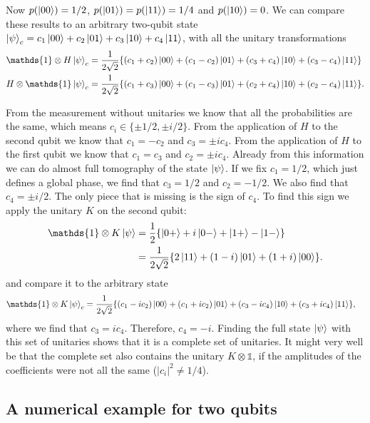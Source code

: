 \documentclass[submission, Phys]{SciPost}
\begin{document}
Now $p(\ket{00}) = 1/2$, $p(\ket{01}) = p(\ket{11}) = 1/4$ and $p(\ket{10}) = 0$.
We can compare these results to an arbitrary two-qubit state $\ket{\psi}_c = c_1 \ket{00} +c_2 \ket{01} + c_3 \ket{10} +c_4 \ket{11}$,
with all the unitary transformations
\begin{align}
	\mathds{1} \otimes H \ket{\psi}_c & = \frac{1}{2\sqrt{2}} \{ (c_1+c_2) \ket{00} + (c_1 -c_2)\ket{01} + (c_3 + c_4)\ket{10} + (c_3-c_4)\ket{11} \}  \\
	H \otimes \mathds{1} \ket{\psi}_c & = \frac{1}{2\sqrt{2}} \{ (c_1+c_3) \ket{00} + (c_1 -c_3)\ket{01} + (c_2 + c_4)\ket{10} + (c_2-c_4)\ket{11} \}.
\end{align}

From the measurement without unitaries we know that all the probabilities are the same,
which means $c_i \in \{ \pm 1/2, \pm i/2 \}$.
From the application of $H$ to the second qubit we know that $c_1 = -c_2$ and $c_3 = \pm i c_4$.
From the application of $H$ to the first qubit we know that $c_1 = c_3$ and $c_2 = \pm i c_4$.
Already from this information we can do almost full tomography of the state $\ket{\psi}$.
If we fix $c_1 = 1/2$, which just defines a global phase, we find that $c_3 = 1/2$ and $c_2 = -1/2$.
We also find that $c_4 = \pm i/2$.
The only piece that is missing is the sign of $c_4$. To find this sign we apply the unitary $K$ on the second qubit:
\begin{align}
	\mathds{1} \otimes K \ket{\psi} & = \frac{1}{2} \{ \ket{0+} +i \ket{0-} + \ket{1+} - \ket{1-} \}           \\
	                                & = \frac{1}{2 \sqrt{2}} \{ 2 \ket{11} + (1-i)\ket{01} + (1+i)\ket{00} \}.
\end{align}
%
and compare it to the arbitrary state
%
\begin{align}
	\mathds{1} \otimes K \ket{\psi}_c & = \frac{1}{2\sqrt{2}} \{ (c_1-ic_2) \ket{00} + (c_1 +ic_2)\ket{01} + (c_3 -ic_4)\ket{10} + (c_3+ic_4)\ket{11} \},
\end{align}
%
where we find that $c_3 = ic_4$. Therefore, $c_4 = -i$.
Finding the full state $\ket{\psi}$ with this set of unitaries shows that it is a complete set of unitaries.
It might very well be that the complete set also contains the unitary $K \otimes \mathds{1}$,
if the amplitudes of the coefficients were not all the same ($|c_i|^2 \neq 1/4$).

\subsection{A numerical example for two qubits}
\end{document}
